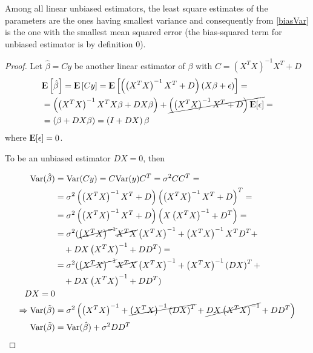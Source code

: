 \begin{theorem}
Among all linear unbiased estimators, the least square estimates of the parameters are the ones having smallest variance and consequently from \autoref{biasVar} is the one with the smallest mean squared error (the bias-squared term for unbiased estimator is by definition $0$).
\begin{proof}
Let $\hat{\beta} = Cy$ be another linear estimator of $\beta$ with $C = (X^TX)^{-1}X^T+D$
\begin{align}
&{\rm I\kern-.3em E}\left[ \hat{\beta} \right] = {\rm I\kern-.3em E}\left[ Cy \right] = {\rm I\kern-.3em E}\left[\left(\left(X^TX\right)^{-1}X^T+D\right) \left( X\beta+\epsilon\right)\right] =\\
& = \left(\left(X^TX\right)^{-1}X^T X\beta +DX\beta\right) +\cancel{\left(\left(X^TX\right)^{-1}X^T  +D\right) {\rm I\kern-.3em E}[\epsilon]}=\\
& = \left(\beta +DX\beta\right) = \left( I +DX\right) \beta\\
\end{align}
where $ {\rm I\kern-.3em E}[\epsilon] = 0$.

To be an unbiased estimator $DX = 0$, then

\begin{equation}
\begin{aligned}
\mathrm{Var}(\hat{\beta}) &= \mathrm{Var}(Cy) = C\mathrm{Var}(y) C^T = \sigma^2 CC^T = \\
&= \sigma^2 \left( \left(X^T X\right)^{-1}X^T +D \right)    \left( \left(X^T X\right)^{-1}X^T+D\right)^T =\\
&= \sigma^2 \left( \left(X^T X\right)^{-1}X^T +D \right)    \left( X \left(X^TX\right)^{-1} + D^T \right)  =\\
&= \sigma^2 (  \cancel{\left(X^TX\right)^{-1}}\cancel{X^T X}   \left(X^TX\right)^{-1} +  \left(X^T X\right)^{-1}X^TD^T                          +\\
&\quad + D X \left(X^TX\right)^{-1} +DD^T) =\\
&= \sigma^2 (  \cancel{\left(X^TX\right)^{-1}}\cancel{X^T X}   \left(X^TX\right)^{-1} +  \left(X^T X\right)^{-1}\left( DX \right)^T                          +\\
&\quad + D X \left(X^TX\right)^{-1} +DD^T) \\
DX=0 \\\Rightarrow \mathrm{Var}(\tilde{\beta}) &= \sigma^2 \left( \left(X^TX\right)^{-1} +  \cancel{\left(X^T X\right)^{-1}\left( DX \right)^T }  + \cancel{D X \left(X^TX\right)^{-1} }+DD^T\right) \\
\mathrm{Var}(\tilde{\beta}) &= \mathrm{Var}(\hat{\beta})  + \sigma^2DD^T
\end{aligned}
\end{equation}

\end{proof}
\end{theorem}
